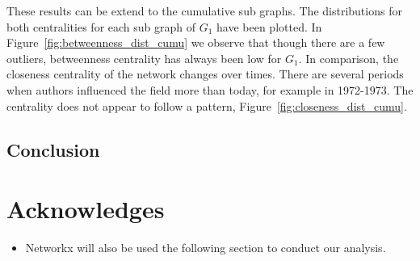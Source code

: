 \documentclass{article}
\theoremstyle{definition}
\begin{document}
These results can be extend to the cumulative sub graphs. The distributions for
both centralities for each sub graph of \(G_1\) have been plotted. In
Figure~\ref{fig:betweenness_dist_cumu} we observe that though there are a few outliers,
betweenness centrality has always been low for \(G_1\). In comparison, the
closeness centrality of the network changes over times. There are several
periods when authors influenced the field more than today, for example in 1972-1973.
The centrality does not appear to follow a pattern, Figure~\ref{fig:closeness_dist_cumu}.

\subsection{Conclusion}

\section{Acknowledges}

\begin{itemize}
    \item Networkx will also be used the following section to conduct our analysis.
\end{itemize}

\newpage


\end{document}
